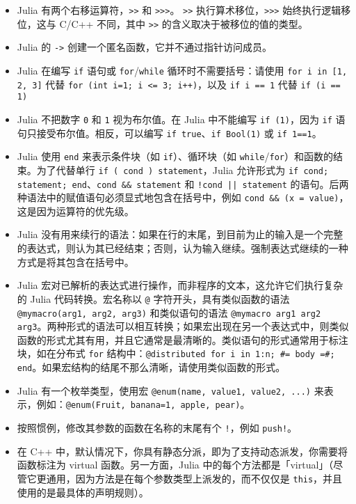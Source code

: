 \begin{itemize}
\item Julia 有两个右移运算符，\texttt{>>} 和 \texttt{>>>}。 \texttt{>>} 执行算术移位，\texttt{>>>} 始终执行逻辑移位，这与 C/C++ 不同，其中 \texttt{>>} 的含义取决于被移位的值的类型。


\item Julia 的 \texttt{->} 创建一个匿名函数，它并不通过指针访问成员。


\item Julia 在编写 \texttt{if} 语句或 \texttt{for}/\texttt{while} 循环时不需要括号：请使用 \texttt{for i in [1, 2, 3]} 代替 \texttt{for (int i=1; i <= 3; i++)}，以及 \texttt{if i == 1} 代替 \texttt{if (i == 1)}


\item Julia 不把数字 \texttt{0} 和 \texttt{1} 视为布尔值。在 Julia 中不能编写 \texttt{if (1)}，因为 \texttt{if} 语句只接受布尔值。相反，可以编写 \texttt{if true}、\texttt{if Bool(1)} 或 \texttt{if 1==1}。


\item Julia 使用 \texttt{end} 来表示条件块（如 \texttt{if}）、循环块（如 \texttt{while}/\texttt{for}）和函数的结束。为了代替单行 \texttt{if ( cond ) statement}，Julia 允许形式为 \texttt{if cond; statement; end}、\texttt{cond \&\& statement} 和 \texttt{!cond || statement} 的语句。后两种语法中的赋值语句必须显式地包含在括号中，例如 \texttt{cond \&\& (x = value)}，这是因为运算符的优先级。


\item Julia 没有用来续行的语法：如果在行的末尾，到目前为止的输入是一个完整的表达式，则认为其已经结束；否则，认为输入继续。强制表达式继续的一种方式是将其包含在括号中。


\item Julia 宏对已解析的表达式进行操作，而非程序的文本，这允许它们执行复杂的 Julia 代码转换。宏名称以 \texttt{@} 字符开头，具有类似函数的语法 \texttt{@mymacro(arg1, arg2, arg3)} 和类似语句的语法 \texttt{@mymacro arg1 arg2 arg3}。两种形式的语法可以相互转换；如果宏出现在另一个表达式中，则类似函数的形式尤其有用，并且它通常是最清晰的。类似语句的形式通常用于标注块，如在分布式 \texttt{for} 结构中：\texttt{@distributed for i in 1:n; \#= body =\#; end}。如果宏结构的结尾不那么清晰，请使用类似函数的形式。


\item Julia 有一个枚举类型，使用宏 \texttt{@enum(name, value1, value2, ...)} 来表示，例如：\texttt{@enum(Fruit, banana=1, apple, pear)}。


\item 按照惯例，修改其参数的函数在名称的末尾有个 \texttt{!}，例如 \texttt{push!}。


\item 在 C++ 中，默认情况下，你具有静态分派，即为了支持动态派发，你需要将函数标注为 virtual 函数。另一方面，Julia 中的每个方法都是「virtual」（尽管它更通用，因为方法是在每个参数类型上派发的，而不仅仅是 \texttt{this}，并且使用的是最具体的声明规则）。

\end{itemize}


